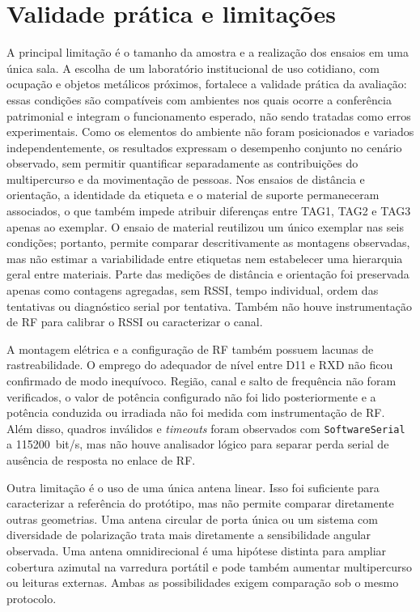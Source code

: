 \section{Validade prática e limitações}

A principal limitação é o tamanho da amostra e a realização dos ensaios em uma única sala. A escolha de um laboratório institucional de uso cotidiano, com ocupação e objetos metálicos próximos, fortalece a validade prática da avaliação: essas condições são compatíveis com ambientes nos quais ocorre a conferência patrimonial e integram o funcionamento esperado, não sendo tratadas como erros experimentais. Como os elementos do ambiente não foram posicionados e variados independentemente, os resultados expressam o desempenho conjunto no cenário observado, sem permitir quantificar separadamente as contribuições do multipercurso e da movimentação de pessoas. Nos ensaios de distância e orientação, a identidade da etiqueta e o material de suporte permaneceram associados, o que também impede atribuir diferenças entre TAG1, TAG2 e TAG3 apenas ao exemplar. O ensaio de material reutilizou um único exemplar nas seis condições; portanto, permite comparar descritivamente as montagens observadas, mas não estimar a variabilidade entre etiquetas nem estabelecer uma hierarquia geral entre materiais. Parte das medições de distância e orientação foi preservada apenas como contagens agregadas, sem RSSI, tempo individual, ordem das tentativas ou diagnóstico serial por tentativa. Também não houve instrumentação de RF para calibrar o RSSI ou caracterizar o canal.

A montagem elétrica e a configuração de RF também possuem lacunas de rastreabilidade. O emprego do adequador de nível entre D11 e RXD não ficou confirmado de modo inequívoco. Região, canal e salto de frequência não foram verificados, o valor de potência configurado não foi lido posteriormente e a potência conduzida ou irradiada não foi medida com instrumentação de RF. Além disso, quadros inválidos e \textit{timeouts} foram observados com \texttt{SoftwareSerial} a 115200~bit/s, mas não houve analisador lógico para separar perda serial de ausência de resposta no enlace de RF.

Outra limitação é o uso de uma única antena linear. Isso foi suficiente para caracterizar a referência do protótipo, mas não permite comparar diretamente outras geometrias. Uma antena circular de porta única ou um sistema com diversidade de polarização trata mais diretamente a sensibilidade angular observada. Uma antena omnidirecional é uma hipótese distinta para ampliar cobertura azimutal na varredura portátil e pode também aumentar multipercurso ou leituras externas. Ambas as possibilidades exigem comparação sob o mesmo protocolo.


